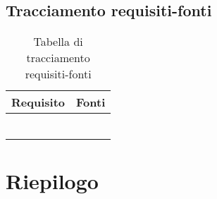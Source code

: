 \documentclass[AnalisiDeiRequisiti.tex]{subfiles}
\begin{document}
\subsection{Tracciamento requisiti-fonti}

\label{table:Tabella di tracciamento requisiti-fonti}
\begin{longtable}[H]{|p{5cm}|p{8cm}|}
	\hline
	\rowcolor[HTML]{38FFF8} 
	\textbf{Requisito} & \textbf{Fonti} \\ \hline
	\endhead
	&  \\ \hline
	&  \\ \hline
	&  \\ \hline
	&  \\ \hline
	&  \\ \hline
	\caption{Tabella di tracciamento requisiti-fonti}
\end{longtable}

\section{Riepilogo}
\end{document}
